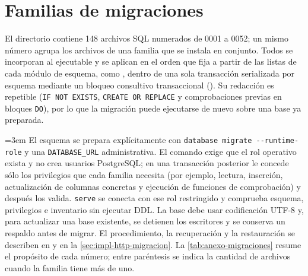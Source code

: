 \section{Familias de migraciones}\label{sec:anexo-migraciones}

El directorio  contiene 148 archivos SQL numerados de 0001 a 0052; un mismo número agrupa los archivos de una familia que se instala en conjunto. Todos se incorporan al ejecutable y se aplican en el orden que fija  a partir de las listas de cada módulo de esquema, como , dentro de una sola transacción serializada por esquema mediante un bloqueo consultivo transaccional (). Su redacción es repetible (\texttt{IF NOT EXISTS}, \texttt{CREATE OR REPLACE} y comprobaciones previas en bloques \texttt{DO}), por lo que la migración puede ejecutarse de nuevo sobre una base ya preparada.

{\emergencystretch=3em El esquema se prepara explícitamente con \texttt{database migrate -{}-runtime-role} y una \texttt{DATABASE\_URL} administrativa. El comando exige que el rol operativo exista y no crea usuarios PostgreSQL; en una transacción posterior le concede sólo los privilegios que cada familia necesita (por ejemplo, lectura, inserción, actualización de columnas concretas y ejecución de funciones de comprobación) y después los valida. \texttt{serve} se conecta con ese rol restringido y comprueba esquema, privilegios e inventario sin ejecutar DDL. La base debe usar codificación UTF-8 y, para actualizar una base existente, se detienen los escritores y se conserva un respaldo antes de migrar. El procedimiento, la recuperación y la restauración se describen en  y en la \cref{sec:impl-http-migracion}. La \cref{tab:anexo-migraciones} resume el propósito de cada número; entre paréntesis se indica la cantidad de archivos cuando la familia tiene más de uno.\par}

\begingroup
\renewcommand{\_}{\textunderscore\allowbreak}

